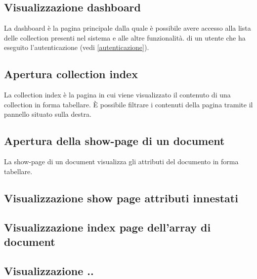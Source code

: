 	\subsection{Visualizzazione dashboard} %
	\label{visualizzazionedashboard}
	La dashboard è la pagina principale dalla quale è possibile avere accesso alla lista delle collection presenti nel sistema e alle altre funzionalità.
	di un utente che ha eseguito l'autenticazione (vedi \ref{autenticazione}).
	

	\subsection{Apertura collection index} %
	\label{aperturacollectionindex}
	La collection index è la pagina in cui viene visualizzato il contenuto di una collection in forma tabellare. \`E possibile filtrare i contenuti della pagina tramite il pannello situato sulla destra.
	

	\subsection{Apertura della show-page di un document} %
	La show-page di un document visualizza gli attributi del documento in forma tabellare.


	\subsection{Visualizzazione show page attributi innestati} %

	\subsection{Visualizzazione index page dell'array di document} %




	




	\subsection{Visualizzazione ..}
	
